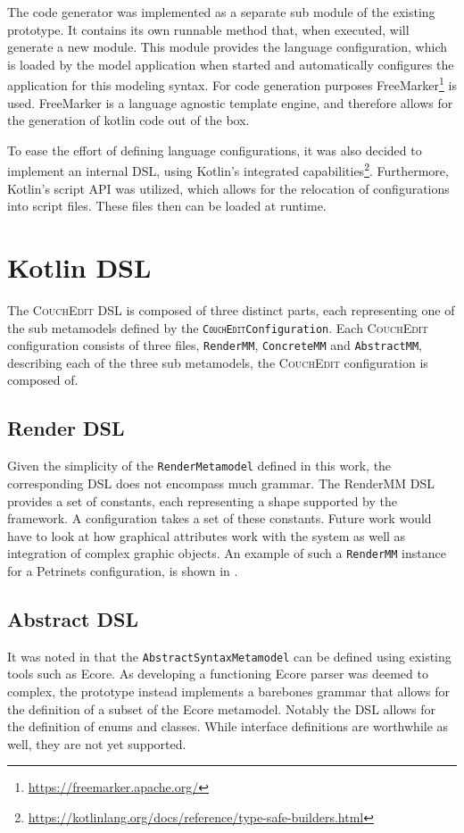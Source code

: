 The code generator was implemented as a separate sub module of the existing prototype. It contains its own runnable method that, when executed, will generate a new module. This module provides the language configuration, which is loaded by the model application when started and automatically configures the application for this modeling syntax. For code generation purposes FreeMarker\footnote{\url{https://freemarker.apache.org/}} is used. FreeMarker is a language agnostic template engine, and therefore allows for the generation of kotlin code out of the box.

To ease the effort of defining language configurations, it was also decided to implement an internal DSL, using Kotlin's integrated capabilities\footnote{\url{https://kotlinlang.org/docs/reference/type-safe-builders.html}}. Furthermore, Kotlin's script API was utilized, which allows for the relocation of configurations into script files. These files then can be loaded at runtime.

\section{Kotlin DSL}
The \textsc{CouchEdit} DSL is composed of three distinct parts, each representing one of the sub metamodels defined by the \texttt{\textsc{CouchEdit}Configuration}. Each \textsc{CouchEdit} configuration consists of three files, \texttt{RenderMM}, \texttt{ConcreteMM} and \texttt{AbstractMM}, describing each of the three sub metamodels, the \textsc{CouchEdit} configuration is composed of.

\subsection{Render DSL}
Given the simplicity of the \texttt{RenderMetamodel} defined in this work, the corresponding DSL does not encompass much grammar. The RenderMM DSL provides a set of constants, each representing a shape supported by the framework. A configuration takes a set of these constants. Future work would have to look at how graphical attributes work with the system as well as integration of complex graphic objects. An example of such a \texttt{RenderMM} instance for a Petrinets configuration, is shown in .

\subsection{Abstract DSL}
It was noted in  that the \texttt{AbstractSyntaxMetamodel} can be defined using existing tools such as Ecore. As developing a functioning Ecore parser was deemed to complex, the prototype instead implements a barebones grammar that allows for the definition of a subset of the Ecore metamodel. Notably the DSL allows for the definition of enums and classes. While interface definitions are worthwhile as well, they are not yet supported.

